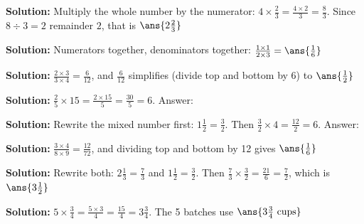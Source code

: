 \documentclass[12pt]{article}
\begin{document}



\textbf{Solution:} Multiply the whole number by the numerator:
$4 \times \tfrac{2}{3} = \tfrac{4 \times 2}{3} = \tfrac{8}{3}$. Since
$8 \div 3 = 2$ remainder $2$, that is
$\ans{2\tfrac{2}{3}}$


\textbf{Solution:} Numerators together, denominators together:
$\tfrac{1 \times 1}{2 \times 3} = \ans{\tfrac{1}{6}}$


\textbf{Solution:} $\tfrac{2 \times 3}{3 \times 4} = \tfrac{6}{12}$, and
$\tfrac{6}{12}$ simplifies (divide top and bottom by 6) to
$\ans{\tfrac{1}{2}}$


\textbf{Solution:} $\tfrac{2}{5} \times 15 = \tfrac{2 \times 15}{5} =
\tfrac{30}{5} = 6$. Answer: 


\textbf{Solution:} Rewrite the mixed number first:
$1\tfrac{1}{2} = \tfrac{3}{2}$. Then
$\tfrac{3}{2} \times 4 = \tfrac{12}{2} = 6$. Answer: 


\textbf{Solution:} $\tfrac{3 \times 4}{8 \times 9} = \tfrac{12}{72}$, and
dividing top and bottom by 12 gives
$\ans{\tfrac{1}{6}}$


\textbf{Solution:} Rewrite both:
$2\tfrac{1}{3} = \tfrac{7}{3}$ and $1\tfrac{1}{2} = \tfrac{3}{2}$. Then
$\tfrac{7}{3} \times \tfrac{3}{2} = \tfrac{21}{6} = \tfrac{7}{2}$, which is
$\ans{3\tfrac{1}{2}}$


\textbf{Solution:} $5 \times \tfrac{3}{4} = \tfrac{5 \times 3}{4} =
\tfrac{15}{4} = 3\tfrac{3}{4}$. The 5 batches use
$\ans{3\tfrac{3}{4}\ \text{cups}}$

\end{document}

